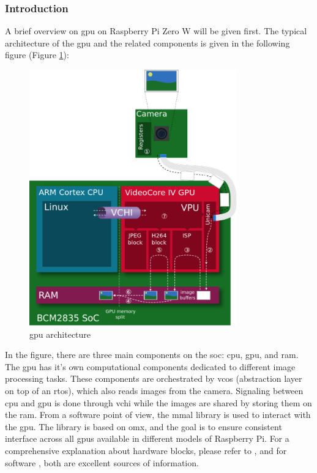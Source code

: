 \subsubsection{Introduction}
A brief overview on \ac{gpu} on Raspberry Pi Zero W will be given first. The typical architecture of the \ac{gpu} and the related components is given in the following figure (Figure \ref{fig:physical:gpu_architecture}):
 
 \begin{figure}[H]
    \centering
    \includegraphics[width=0.8\textwidth]{physical/figures/gpu_architecture}
    \caption{\ac{gpu} architecture \cite{jones_videocore_nodate-1}}
    \label{fig:physical:gpu_architecture}
\end{figure}

In the figure, there are three main components on the \ac{soc}: \ac{cpu}, \ac{gpu}, and \ac{ram}.
The \ac{gpu} has it's own computational components dedicated to different image processing tasks.
These components are orchestrated by \ac{vcos} (abstraction layer on top of an \ac{rtos}), which also reads images from the camera.
Signaling between \ac{cpu} and \ac{gpu} is done through \ac{vchi} while the images are shared by storing them on the \ac{ram}.
From a software point of view, the \ac{mmal} library is used to interact with the \ac{gpu}.
The library is based on \ac{omx}, and the goal is to ensure consistent interface across all \acp{gpu} available in different models of Raspberry Pi.
For a comprehensive explanation about hardware blocks, please refer to \cite{jones_videocore_nodate-1}, and for software \cite{jones_videocore_nodate}, both are excellent sources of information.


